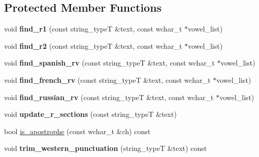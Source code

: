 \subsection*{Protected Member Functions}
\begin{DoxyCompactItemize}
\item 
\hypertarget{group___stemming_ga364b7a76f683d5244715638069a4fa93}{void {\bfseries find\-\_\-r1} (const string\-\_\-type\-T \&text, const wchar\-\_\-t $\ast$vowel\-\_\-list)}\label{group___stemming_ga364b7a76f683d5244715638069a4fa93}

\item 
\hypertarget{group___stemming_gab381c0d6a6291c2c21515e9398e83085}{void {\bfseries find\-\_\-r2} (const string\-\_\-type\-T \&text, const wchar\-\_\-t $\ast$vowel\-\_\-list)}\label{group___stemming_gab381c0d6a6291c2c21515e9398e83085}

\item 
\hypertarget{group___stemming_gae6cb258098ba91462d421977b1eed8e7}{void {\bfseries find\-\_\-spanish\-\_\-rv} (const string\-\_\-type\-T \&text, const wchar\-\_\-t $\ast$vowel\-\_\-list)}\label{group___stemming_gae6cb258098ba91462d421977b1eed8e7}

\item 
\hypertarget{group___stemming_ga9626e49b982eda0d8ec3bb861d864b42}{void {\bfseries find\-\_\-french\-\_\-rv} (const string\-\_\-type\-T \&text, const wchar\-\_\-t $\ast$vowel\-\_\-list)}\label{group___stemming_ga9626e49b982eda0d8ec3bb861d864b42}

\item 
\hypertarget{group___stemming_ga53dcfe6b18fe5b5882474f222190ef1b}{void {\bfseries find\-\_\-russian\-\_\-rv} (const string\-\_\-type\-T \&text, const wchar\-\_\-t $\ast$vowel\-\_\-list)}\label{group___stemming_ga53dcfe6b18fe5b5882474f222190ef1b}

\item 
\hypertarget{group___stemming_ga9dcc3d89844ecd5c81eabf80936a0209}{void {\bfseries update\-\_\-r\-\_\-sections} (const string\-\_\-type\-T \&text)}\label{group___stemming_ga9dcc3d89844ecd5c81eabf80936a0209}

\item 
bool \hyperlink{group___stemming_ga0b423c8a1a53ec586da4613472d61e34}{is\-\_\-apostrophe} (const wchar\-\_\-t \&ch) const 
\item 
\hypertarget{group___stemming_ga36818a956dd34c388fa9942ed46e28b4}{void {\bfseries trim\-\_\-western\-\_\-punctuation} (string\-\_\-type\-T \&text) const }\label{group___stemming_ga36818a956dd34c388fa9942ed46e28b4}


\end{DoxyCompactItemize}
